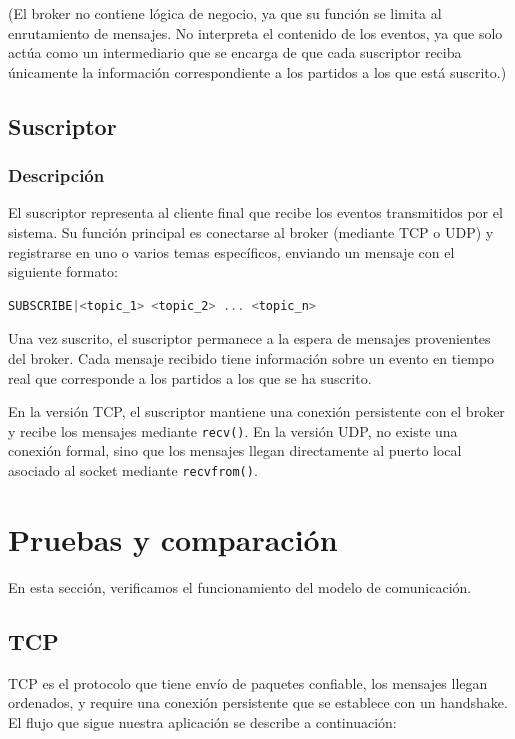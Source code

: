\documentclass[10pt]{article}
\begin{document}
(El broker no contiene lógica de negocio, ya que su función se limita al enrutamiento de mensajes. No interpreta el contenido de los eventos, ya que solo actúa como un intermediario que se encarga de que cada suscriptor reciba únicamente la información correspondiente a los partidos a los que está suscrito.)

\subsection{Suscriptor}
\subsubsection{Descripción}
El suscriptor representa al cliente final que recibe los eventos transmitidos por el sistema. Su función principal es conectarse al broker (mediante TCP o UDP) y registrarse en uno o varios temas específicos, enviando un mensaje con el siguiente formato:

\begin{lstlisting}[language=C, caption={}]
SUBSCRIBE|<topic_1> <topic_2> ... <topic_n> 
\end{lstlisting}

Una vez suscrito, el suscriptor permanece a la espera de mensajes provenientes del broker. Cada mensaje recibido tiene información sobre un evento en tiempo real que corresponde a los partidos a los que se ha suscrito.

En la versión TCP, el suscriptor mantiene una conexión persistente con el broker y recibe los mensajes mediante \texttt{recv()}. En la versión UDP, no existe una conexión formal, sino que los mensajes llegan directamente al puerto local asociado al socket mediante \texttt{recvfrom()}.

\section{Pruebas y comparación}
En esta sección, verificamos el funcionamiento del modelo de comunicación. 
\subsection{TCP}
TCP es el protocolo que tiene envío de paquetes confiable, los mensajes llegan ordenados, y require una conexión persistente que se establece con un handshake. El flujo que sigue nuestra aplicación se describe a continuación:
\end{document}
